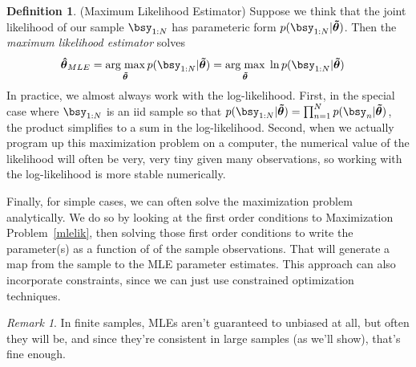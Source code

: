 \documentclass[12pt]{article}
\theoremstyle{plain}
\theoremstyle{definition}
\newtheorem{defn}[thm]{Definition}
\theoremstyle{remark}
\newtheorem*{rmk}{Remark}
\newcommand{\bshattheta}{\boldsymbol{\hat{\theta}}}
\newcommand{\bstildetheta}{\boldsymbol{\tilde{\theta}}}
\DeclareMathOperator*{\argmax}{arg\;max}
\newcommand{\nN}{_{n=1}^N}
\begin{document}
\begin{defn}(Maximum Likelihood Estimator)
Suppose we think that the joint likelihood of our sample $\bsy_{1:N}$
has parameteric form $p(\bsy_{1:N}|\bstildetheta)$. Then the
\emph{maximum likelihood estimator} solves
\begin{align}
  \bshattheta_{MLE}
  &=
  \argmax_{\bstildetheta} p(\bsy_{1:N}|\bstildetheta)
  =
  \argmax_{\bstildetheta}\;
  \ln p(\bsy_{1:N}|\bstildetheta)
  \label{mlelik}
\end{align}
In practice, we almost always work with the log-likelihood. First, in
the special case where $\bsy_{1:N}$ is an iid sample so that
$p(\bsy_{1:N}|\bstildetheta)=\prod\nN p(\bsy_n|\bstildetheta)$, the
product simplifies to a sum in the log-likelihood. Second, when we
actually program up this maximization problem on a computer, the
numerical value of the likelihood will often be very, very tiny given
many observations, so working with the log-likelihood is more stable
numerically.

Finally, for simple cases, we can often solve the maximization problem
analytically. We do so by looking at the first order conditions to
Maximization Problem~\ref{mlelik}, then solving those first order
conditions to write the parameter(s) as a function of of the sample
observations. That will generate a map from the sample to the MLE
parameter estimates. This approach can also incorporate constraints,
since we can just use constrained optimization techniques.
\end{defn}
\begin{rmk}
In finite samples, MLEs aren't guaranteed to unbiased at all, but often
they will be, and since they're consistent in large samples (as we'll
show), that's fine enough.
\end{rmk}
\end{document}
